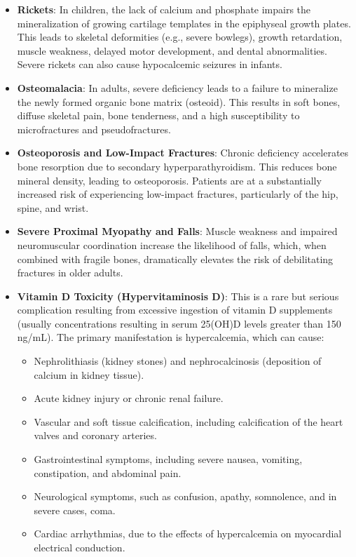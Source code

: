 \begin{itemize}
    \item \textbf{Rickets}: In children, the lack of calcium and phosphate impairs the mineralization of growing cartilage templates in the epiphyseal growth plates. This leads to skeletal deformities (e.g., severe bowlegs), growth retardation, muscle weakness, delayed motor development, and dental abnormalities. Severe rickets can also cause hypocalcemic seizures in infants.
    \item \textbf{Osteomalacia}: In adults, severe deficiency leads to a failure to mineralize the newly formed organic bone matrix (osteoid). This results in soft bones, diffuse skeletal pain, bone tenderness, and a high susceptibility to microfractures and pseudofractures.
    \item \textbf{Osteoporosis and Low-Impact Fractures}: Chronic deficiency accelerates bone resorption due to secondary hyperparathyroidism. This reduces bone mineral density, leading to osteoporosis. Patients are at a substantially increased risk of experiencing low-impact fractures, particularly of the hip, spine, and wrist.
    \item \textbf{Severe Proximal Myopathy and Falls}: Muscle weakness and impaired neuromuscular coordination increase the likelihood of falls, which, when combined with fragile bones, dramatically elevates the risk of debilitating fractures in older adults.
    \item \textbf{Vitamin D Toxicity (Hypervitaminosis D)}: This is a rare but serious complication resulting from excessive ingestion of vitamin D supplements (usually concentrations resulting in serum 25(OH)D levels greater than 150 ng/mL). The primary manifestation is hypercalcemia, which can cause:
    \begin{itemize}
        \item Nephrolithiasis (kidney stones) and nephrocalcinosis (deposition of calcium in kidney tissue).
        \item Acute kidney injury or chronic renal failure.
        \item Vascular and soft tissue calcification, including calcification of the heart valves and coronary arteries.
        \item Gastrointestinal symptoms, including severe nausea, vomiting, constipation, and abdominal pain.
        \item Neurological symptoms, such as confusion, apathy, somnolence, and in severe cases, coma.
        \item Cardiac arrhythmias, due to the effects of hypercalcemia on myocardial electrical conduction.
    \end{itemize}
\end{itemize}

